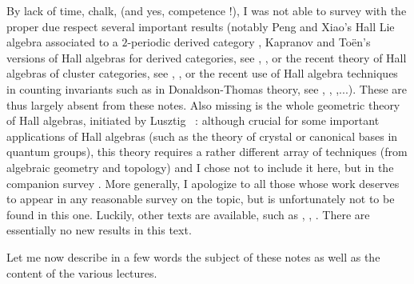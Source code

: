 \documentclass[a4paper,10pt]{amsart}
\numberwithin{equation}{section}
\begin{document}
\vspace{.05in}

By lack of time, chalk, (and yes, competence !), I was not able to survey with the proper due respect several important results (notably Peng and Xiao's Hall Lie algebra associated to a $2$-periodic derived category \cite{PX}, Kapranov and To\"en's versions of Hall algebras for derived categories, see \cite{Kap2}, \cite{Toen}, or the recent theory of Hall algebras of cluster categories, see \cite{CalKel}, \cite{CalKeller}, or the recent use of Hall algebra techniques in counting invariants such as in Donaldson-Thomas theory, see \cite{Joyce}, \cite{KoSoi}, \cite{ReinekeDT},...). These are thus largely absent from these notes. Also missing is the whole geometric theory of Hall algebras, initiated by Lusztig \cite{Lu1}~: although crucial for some important applications of Hall algebras (such as the theory of crystal or canonical bases in quantum groups), this theory requires a rather different array of techniques (from algebraic geometry and topology) and I chose not to include it here, but in the companion survey \cite{SLectures2}.
More generally, I apologize to all those whose work deserves to appear in any reasonable survey on the topic, but is unfortunately not to be found in this one. Luckily, other texts are available, such as \cite{Ringelsurvey1}, \cite{Ringelsurvey2}, \cite{Hubery1}.  There are essentially no new results in this text.

\vspace{.1in}

Let me now describe in a few words the subject of these notes as well as the content of the various lectures.

\vspace{.1in}
\end{document}
